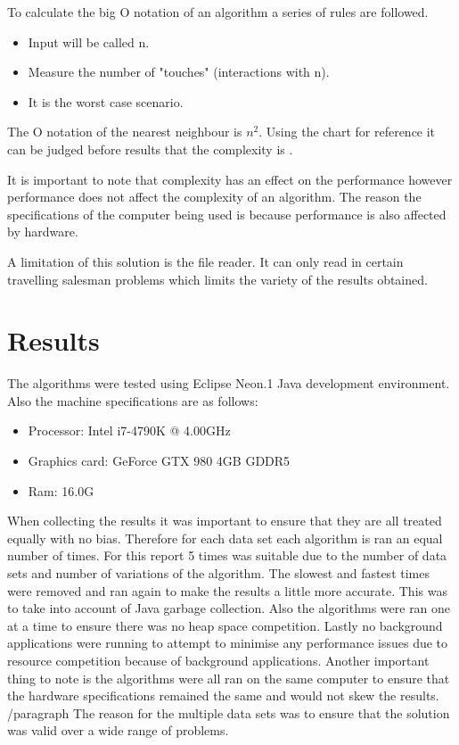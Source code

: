 \documentclass[conference,backref=page]{acmsiggraph}
\begin{document}
To calculate the big O notation of an algorithm a series of rules are followed.
\begin{itemize}
	\item Input will be called n.
	\item Measure the number of "touches" (interactions with n).
	\item It is the worst case scenario.
	
\end{itemize}

The O notation of the nearest neighbour is \begin{math}{n^2} \end{math}. Using the chart for reference it can be judged before results that the complexity is .



It is important to note that complexity has an effect on the performance however performance does not affect the complexity of an algorithm. The reason the specifications of the computer being used is because performance is also affected by hardware.

A limitation of this solution is the file reader. It can only read in certain travelling salesman problems which limits the variety of the results obtained. 
\section{Results}

The algorithms were tested using Eclipse Neon.1 Java development environment. Also the machine specifications are as follows:
\begin{itemize}
\item Processor:	Intel i7-4790K @ 4.00GHz
\item Graphics card:	GeForce GTX 980	4GB GDDR5
\item Ram:	16.0G

\end{itemize}

When collecting the results it was important to ensure that they are all treated equally with no bias. Therefore for each data set each algorithm is ran an equal number of times. For this report 5 times was suitable due to the number of data sets and number of variations of the algorithm. The slowest and fastest times were removed and ran again to make the results a little more accurate. This was to take into account of Java garbage collection. Also the algorithms were ran one at a time to ensure there was no heap space competition. Lastly no background applications were running to attempt to minimise any performance issues due to resource competition because of background applications. Another important thing to note is the algorithms were all ran on the same computer to ensure that the hardware specifications remained the same and would not skew the results.
/paragraph{}
The reason for the multiple data sets was to ensure that the solution was valid over a wide range of problems.
\end{document}
